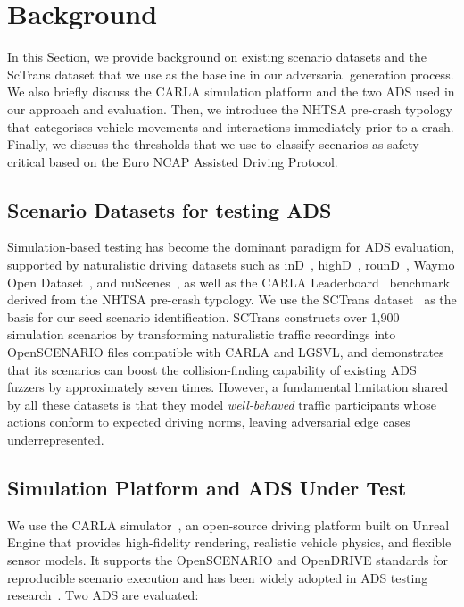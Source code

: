 \section{Background}

In this Section, we provide background on existing scenario datasets and the ScTrans dataset that we use as the baseline in our adversarial generation process. We also briefly discuss the CARLA simulation platform and the two ADS used in our approach and evaluation. Then, we introduce the NHTSA pre-crash typology that categorises vehicle movements and interactions immediately prior to a crash. Finally, we discuss the thresholds that we use to classify scenarios as safety-critical based on the Euro NCAP Assisted Driving Protocol. 
\subsection{Scenario Datasets for testing ADS}\label{sec:scenario_based_testing}

Simulation-based testing has become the dominant paradigm for ADS evaluation, supported by naturalistic driving datasets such as inD~\cite{bock_ind_2020}, highD~\cite{krajewski_highd_2018}, rounD~\cite{krajewski_round_2020}, Waymo Open Dataset~\cite{sun_scalability_2020}, and nuScenes~\cite{caesar_nuscenes_2020}, as well as the CARLA Leaderboard~\cite{noauthor_carla_nodate} benchmark derived from the NHTSA pre-crash typology. We use the SCTrans dataset~\cite{dai_sctrans_2024} as the basis for our seed scenario identification. SCTrans constructs over 1,900 simulation scenarios by transforming naturalistic traffic recordings into OpenSCENARIO files compatible with CARLA and LGSVL, and demonstrates that its scenarios can boost the collision-finding capability of existing ADS fuzzers by approximately seven times. However, a fundamental limitation shared by all these datasets is that they model \textit{well-behaved} traffic participants whose actions conform to expected driving norms, leaving adversarial edge cases underrepresented.

\subsection{Simulation Platform and ADS Under Test}\label{sec:platform_ads}

We use the CARLA simulator~\cite{dosovitskiy_carla_2017}, an open-source driving platform built on Unreal Engine that provides high-fidelity rendering, realistic vehicle physics, and flexible sensor models. It supports the OpenSCENARIO and OpenDRIVE standards for reproducible scenario execution and has been widely adopted in ADS testing research~\cite{kim_drivefuzz_2022, yan_-demand_2025, li_av-fuzzer_2020}. Two ADS are evaluated:

